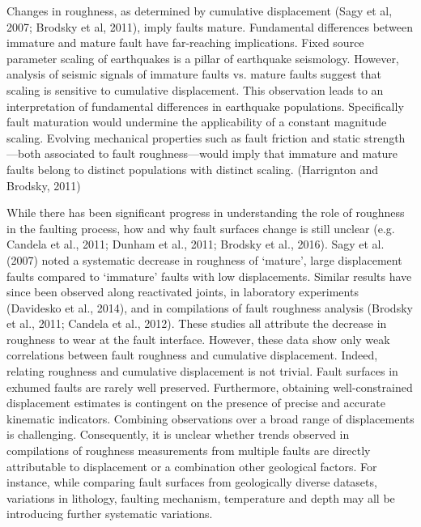 \documentclass[12pt,a4paper]{article}
\begin{document}
Changes in roughness, as determined by cumulative displacement (Sagy et al, 2007; Brodsky et al, 2011), imply faults mature. Fundamental differences between immature and mature fault have far-reaching implications. Fixed source parameter scaling of earthquakes is a pillar of earthquake seismology. However, analysis of seismic signals of immature faults vs. mature faults suggest that scaling is sensitive to cumulative displacement. This observation leads to an interpretation of fundamental differences in earthquake populations. Specifically fault maturation would undermine the applicability of a constant magnitude scaling. Evolving mechanical properties such as fault friction and static strength—both associated to fault roughness—would imply that immature and mature faults belong to distinct populations with distinct scaling. (Harrignton and Brodsky, 2011)

While there has been significant progress in understanding the role of roughness in the faulting process, how and why fault surfaces change is still unclear (e.g. Candela et al., 2011; Dunham et al., 2011; Brodsky et al., 2016). Sagy et al. (2007) noted a systematic decrease in roughness of ‘mature’, large displacement faults compared to ‘immature’ faults with low displacements. Similar results have since been observed along reactivated joints, in laboratory experiments (Davidesko et al., 2014), and in compilations of fault roughness analysis (Brodsky et al., 2011; Candela et al., 2012). These studies all attribute the decrease in roughness to wear at the fault interface. However, these data show only weak correlations between fault roughness and cumulative displacement. Indeed, relating roughness and cumulative displacement is not trivial. Fault surfaces in exhumed faults are rarely well preserved. Furthermore, obtaining well-constrained displacement estimates is contingent on the presence of precise and accurate kinematic indicators. Combining observations over a broad range of displacements is challenging. Consequently, it is unclear whether trends observed in compilations of roughness measurements from multiple faults are directly attributable to displacement or a combination other geological factors. For instance, while comparing fault surfaces from geologically diverse datasets, variations in lithology, faulting mechanism, temperature and depth may all be introducing further systematic variations. 
\end{document}
